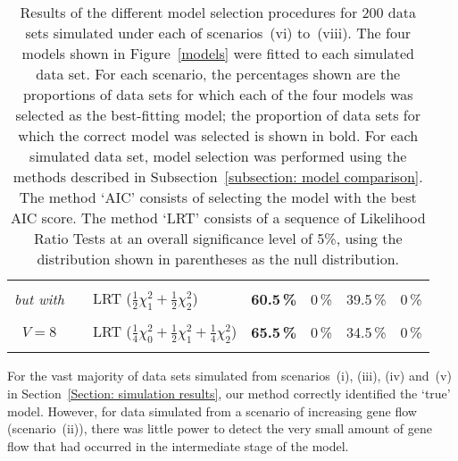 \documentclass[11pt]{article}
\begin{document}
\begin{table}[!b]
\begin{center}
{\begin{tabular}{|c|c|l|rrrr|}
\vspace*{-3mm} & & & & & &  \\
     {\em but with}           &                 & LRT ($\frac{1}{2} \chi^2_1 +\frac{1}{2} \chi^2_2$)                                                 & {\bf 60.5\,\%} & 0\,\% & 39.5\,\% & 0\,\% \\
\vspace*{-3mm} & & & & & &  \\
    $V=8$         &                 & LRT ($\frac{1}{4} \chi^2_0 +\frac{1}{2} \chi^2_1 +\frac{1}{4} \chi^2_2$)                        & {\bf 65.5\,\%} & 0\,\% & 34.5\,\% & 0\,\% \\ 
 & & & & & &  \\
\hline
\end{tabular}}
\end{center}
\caption*{Results of the different model selection procedures for 200 data sets simulated under each of scenarios~(vi) to~(viii). The four models shown in Figure~\ref{models} were fitted to each simulated data set. For each scenario, the percentages shown are the proportions of data sets for which each of the four models was selected as the best-fitting model; the proportion of data sets for which the correct model was selected is shown in bold. For each simulated data set, model selection was performed using the methods described in Subsection~\ref{subsection: model comparison}. The method `AIC' consists of selecting the model with the best AIC score. The method `LRT' consists of a sequence of Likelihood Ratio Tests at an overall significance level of 5\%, using the distribution shown in parentheses as the null distribution. 
}
\end{table}
For the vast majority of data sets simulated from scenarios~(i), (iii), (iv) and~(v) in Section~\ref{Section: simulation results}, our method correctly identified the `true' model. 
However, for data simulated from a scenario of increasing gene flow (scenario~(ii)), there was little power 
to detect the very small amount of gene flow that had occurred in the intermediate stage of the model.
\end{document}
